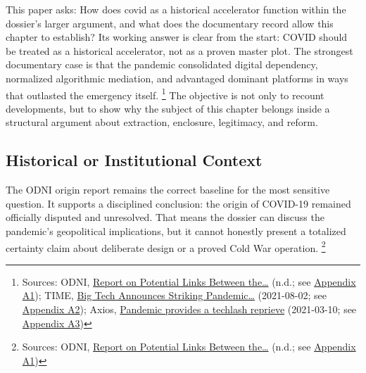 \documentclass[
  american,
  11pt,
  letterpaper,
]{article}
\begin{document}
This paper asks: How does covid as a historical accelerator function
within the dossier's larger argument, and what does the documentary
record allow this chapter to establish? Its working answer is clear from
the start: COVID should be treated as a historical accelerator, not as a
proven master plot. The strongest documentary case is that the pandemic
consolidated digital dependency, normalized algorithmic mediation, and
advantaged dominant platforms in ways that outlasted the emergency
itself. \footnote{Sources: ODNI,
  \href{https://www.dni.gov/files/ODNI/documents/assessments/Report-on-Potential-Links-Between-the-Wuhan-Institute-of-Virology-and-the-Origins-of-COVID-19-20230623.pdf}{Report
  on Potential Links Between the\ldots{}} (n.d.; see
  \hyperref[appendix-a1-report-on-potential-links-between-the-wuhan-institute-of-virology-and-the-origins-of-covid-19]{Appendix
  A1}); TIME,
  \href{https://time.com/6085674/big-tech-apple-microsoft-facebook-amazon-google-earnings/}{Big
  Tech Announces Striking Pandemic\ldots{}} (2021-08-02; see
  \hyperref[appendix-a2-big-tech-announces-striking-pandemic-gains-as-small-businesses-strain-to-find-their-footing]{Appendix
  A2}); Axios,
  \href{https://www.axios.com/2021/03/10/pandemic-provides-techlash-reprieve}{Pandemic
  provides a techlash reprieve} (2021-03-10; see
  \hyperref[appendix-a3-pandemic-provides-a-techlash-reprieve]{Appendix
  A3})} The objective is not only to recount developments, but to show
why the subject of this chapter belongs inside a structural argument
about extraction, enclosure, legitimacy, and reform.

\subsection{Historical or Institutional
Context}\label{historical-or-institutional-context}

The ODNI origin report remains the correct baseline for the most
sensitive question. It supports a disciplined conclusion: the origin of
COVID-19 remained officially disputed and unresolved. That means the
dossier can discuss the pandemic's geopolitical implications, but it
cannot honestly present a totalized certainty claim about deliberate
design or a proved Cold War operation. \footnote{Sources: ODNI,
  \href{https://www.dni.gov/files/ODNI/documents/assessments/Report-on-Potential-Links-Between-the-Wuhan-Institute-of-Virology-and-the-Origins-of-COVID-19-20230623.pdf}{Report
  on Potential Links Between the\ldots{}} (n.d.; see
  \hyperref[appendix-a1-report-on-potential-links-between-the-wuhan-institute-of-virology-and-the-origins-of-covid-19]{Appendix
  A1})}
\end{document}
